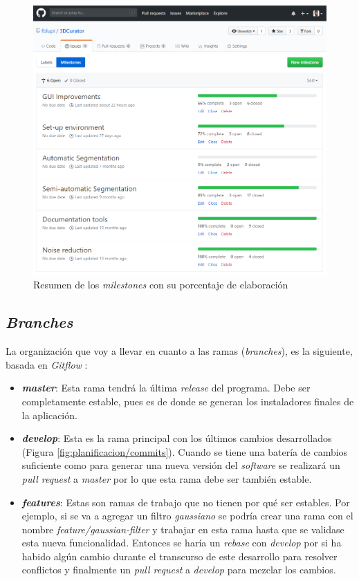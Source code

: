 \begin{figure}[H]
	\centering
	\includegraphics[width=12cm]{imagenes/planificacion/milestones}
	\caption{Resumen de los \textit{milestones} con su porcentaje de elaboración}
	\label{fig:planificacion/milestones}
\end{figure}

\subsection{\textit{Branches}}

La organización que voy a llevar en cuanto a las ramas (\textit{branches}), es la siguiente, basada en \textit{Gitflow} \cite{gitflow}:

\begin{itemize}
	\item \textbf{\textit{master}}: Esta rama tendrá la última \textit{release} del programa. Debe ser completamente estable, pues es de donde se generan los instaladores finales de la aplicación.
	\item \textbf{\textit{develop}}: Esta es la rama principal con los últimos cambios desarrollados (Figura \ref{fig:planificacion/commits}). Cuando se tiene una batería de cambios suficiente como para generar una nueva versión del \textit{software} se realizará un \textit{pull request} a \textit{master} por lo que esta rama debe ser también estable.
	\item \textbf{\textit{features}}: Estas son ramas de trabajo que no tienen por qué ser estables. Por ejemplo, si se va a agregar un filtro \textit{gaussiano} se podría crear una rama con el nombre \textit{feature/gaussian-filter} y trabajar en esta rama hasta que se validase esta nueva funcionalidad. Entonces se haría un \textit{rebase} con \textit{develop} por si ha habido algún cambio durante el transcurso de este desarrollo para resolver conflictos y finalmente un \textit{pull request} a \textit{develop} para mezclar los cambios.
\end{itemize}

